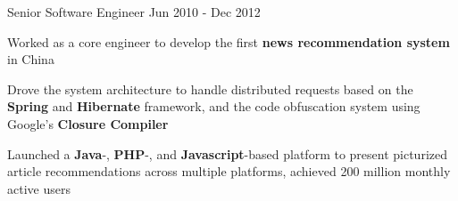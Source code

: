 \begin{cventries}
  \cventry
    {Senior Software Engineer}
    {} %
    {} %
    {Jun 2010 - Dec 2012} %
    {
      \begin{cvitems} %
        \item {Worked as a core engineer to develop the first \textbf{news recommendation system} in China}
        \item {Drove the system architecture to handle distributed requests based on the \textbf{Spring} and \textbf{Hibernate} framework, and the code obfuscation system using Google's \textbf{Closure Compiler}}
        \item{Launched a \textbf{Java}-, \textbf{PHP}-, and \textbf{Javascript}-based platform to present picturized article recommendations across multiple platforms, achieved 200 million monthly active users}
      \end{cvitems}
    }

\end{cventries}
